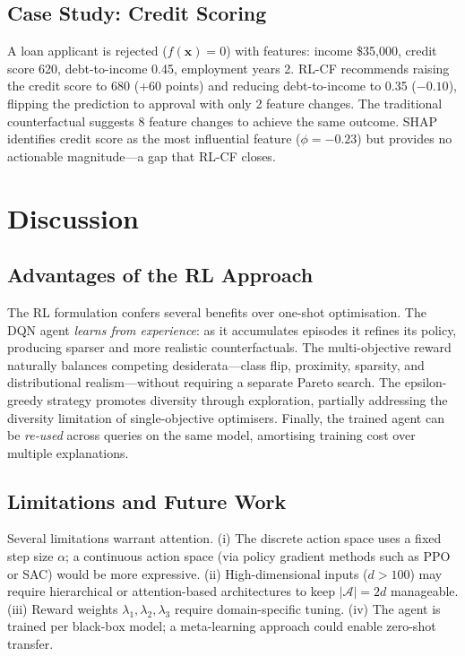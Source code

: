 \documentclass[conference]{IEEEtran}
\newcommand{\bx}{\mathbf{x}}
\begin{document}
\subsection{Case Study: Credit Scoring}

A loan applicant is rejected ($f(\bx)=0$) with features: income \$35,000,
credit score 620, debt-to-income 0.45, employment years 2. RL-CF recommends
raising the credit score to 680 (+60 points) and reducing debt-to-income to
0.35 ($-0.10$), flipping the prediction to approval with only 2 feature changes.
The traditional counterfactual suggests 8 feature changes to achieve the same
outcome. SHAP identifies credit score as the most influential feature
($\phi=-0.23$) but provides no actionable magnitude---a gap that RL-CF closes.

\section{Discussion}
\label{sec:discussion}

\subsection{Advantages of the RL Approach}

The RL formulation confers several benefits over one-shot optimisation. The DQN
agent \emph{learns from experience}: as it accumulates episodes it refines its
policy, producing sparser and more realistic counterfactuals. The multi-objective
reward naturally balances competing desiderata---class flip, proximity, sparsity,
and distributional realism---without requiring a separate Pareto search. The
epsilon-greedy strategy promotes diversity through exploration, partially
addressing the diversity limitation of single-objective optimisers. Finally, the
trained agent can be \emph{re-used} across queries on the same model, amortising
training cost over multiple explanations.

\subsection{Limitations and Future Work}

Several limitations warrant attention. (i) The discrete action space uses a fixed
step size $\alpha$; a continuous action space (via policy gradient methods such as
PPO or SAC) would be more expressive. (ii) High-dimensional inputs ($d > 100$)
may require hierarchical or attention-based architectures to keep $|\mathcal{A}|
= 2d$ manageable. (iii) Reward weights $\lambda_1,\lambda_2,\lambda_3$ require
domain-specific tuning. (iv) The agent is trained per black-box model; a
meta-learning approach could enable zero-shot transfer.
\end{document}
